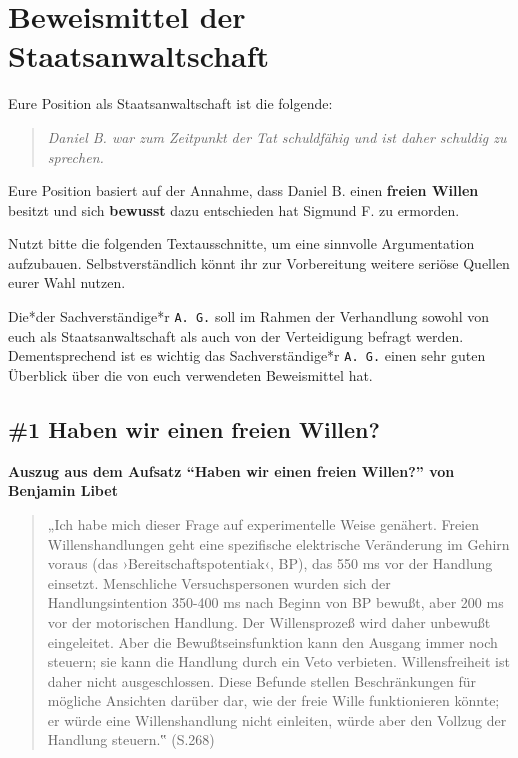 \documentclass[
  a4paper,
]{report}
\begin{document}
\hypertarget{prosecution-evidence}{%
\chapter{Beweismittel der Staatsanwaltschaft}\label{prosecution-evidence}}

Eure Position als Staatsanwaltschaft ist die folgende:

\begin{quote}
\emph{Daniel B. war zum Zeitpunkt der Tat schuldfähig und ist daher schuldig zu sprechen.}
\end{quote}

Eure Position basiert auf der Annahme, dass Daniel B. einen \textbf{freien Willen} besitzt und sich \textbf{bewusst} dazu entschieden hat Sigmund F. zu ermorden.

Nutzt bitte die folgenden Textausschnitte, um eine sinnvolle Argumentation aufzubauen. Selbstverständlich könnt ihr zur Vorbereitung weitere seriöse Quellen eurer Wahl nutzen.

Die*der Sachverständige*r \texttt{A.\ G.} soll im Rahmen der Verhandlung sowohl von euch als Staatsanwaltschaft als auch von der Verteidigung befragt werden. Dementsprechend ist es wichtig das Sachverständige*r \texttt{A.\ G.} einen sehr guten Überblick über die von euch verwendeten Beweismittel hat.

\hypertarget{pr-ev1}{%
\section{\#1 Haben wir einen freien Willen?}\label{pr-ev1}}

\textbf{Auszug aus dem Aufsatz ``Haben wir einen freien Willen?'' von Benjamin Libet \citeyearpar{Libet2004}}

\begin{quote}
„Ich habe mich dieser Frage auf experimentelle Weise genähert. Freien Willenshandlungen geht eine spezifische elektrische Veränderung im Gehirn voraus (das ›Bereitschaftspotentiak‹, BP), das 550 ms vor der Handlung einsetzt. Menschliche Versuchspersonen wurden sich der Handlungsintention 350-400 ms nach Beginn von BP bewußt, aber 200 ms vor der motorischen Handlung. Der Willensprozeß wird daher unbewußt eingeleitet. Aber die Bewußtseinsfunktion kann den Ausgang immer noch steuern; sie kann die Handlung durch ein Veto verbieten. Willensfreiheit ist daher nicht ausgeschlossen. Diese Befunde stellen Beschränkungen für mögliche Ansichten darüber dar, wie der freie Wille funktionieren könnte; er würde eine Willenshandlung nicht einleiten, würde aber den Vollzug der Handlung steuern.‟ (S.268)
\end{quote}
\end{document}
